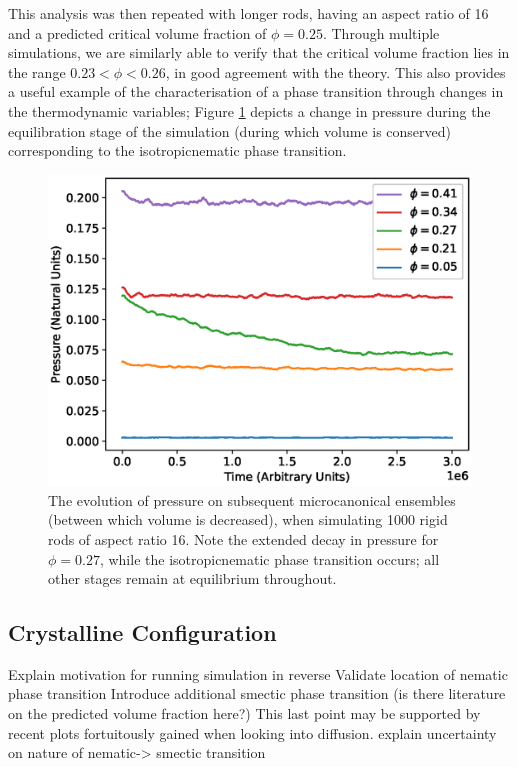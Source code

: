 \documentclass[11pt, a4paper]{article} %
\begin{document}
This analysis was then repeated with longer rods, having an aspect ratio of \num{16} and a predicted critical volume fraction of $\phi  = 0.25$. Through multiple simulations, we are similarly able to verify that the critical volume fraction lies in the range $0.23 < \phi< 0.26$, in good agreement with the theory. This also provides a useful example of the characterisation of a phase transition through changes in the thermodynamic variables; Figure \ref{fig:rr_pressureevo} depicts a change in pressure during the equilibration stage of the simulation (during which volume is conserved) corresponding to the isotropic\textendash nematic phase transition.

\begin{figure} [h!]
	\centering
	\includegraphics[width=0.7\linewidth]{Figures/rigidrod_pressureevo}
	\caption{The evolution of pressure on subsequent microcanonical ensembles (between which volume is decreased), when simulating 1000 rigid rods of aspect ratio 16. Note the extended decay in pressure for $\phi  = 0.27$, while the isotropic\textendash nematic phase transition occurs; all other stages remain at equilibrium throughout.}
	\label{fig:rr_pressureevo}
\end{figure} %



\subsection{Crystalline Configuration}
Explain motivation for running simulation in reverse
Validate location of nematic phase transition
Introduce additional smectic phase transition (is there literature on the predicted volume fraction here?)
This last point may be supported by recent plots fortuitously gained when looking into diffusion.
explain uncertainty on nature of nematic-> smectic transition
\end{document}
